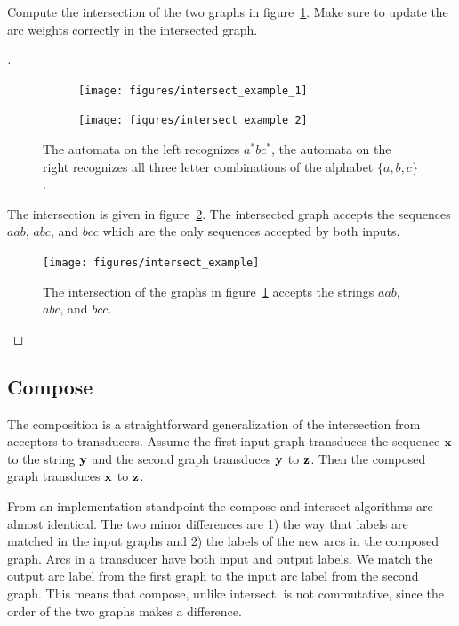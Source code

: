 \begin{example}
Compute the intersection of the two graphs in
figure~\ref{fig:intersect_example_inputs}. Make sure to update the arc
weights correctly in the intersected graph.
\end{example}

\begin{proof}[\unskip\nopunct]
\begin{figure}
    \centering
    \begin{subfigure}[b]{0.3\textwidth}
        \centering
        \texttt{[image: figures/intersect\_example\_1]}
    \end{subfigure}
    \begin{subfigure}[b]{0.68\textwidth}
        \centering
        \texttt{[image: figures/intersect\_example\_2]}
    \end{subfigure}
    \caption{The automata on the left recognizes $a^*bc^*$, the automata on the
    right recognizes all three letter combinations of the alphabet $\{a, b,
    c\}$.}
    \label{fig:intersect_example_inputs}
\end{figure}

The intersection is given in figure~\ref{fig:intersect_example}. The
intersected graph accepts the sequences $aab$, $abc$, and $bcc$ which are
the only sequences accepted by both inputs.

\begin{figure}
    \centering
    \texttt{[image: figures/intersect\_example]}
    \caption{The intersection of the graphs in
    figure~\ref{fig:intersect_example_inputs} accepts the strings $aab$, $abc$,
    and $bcc$.}
    \label{fig:intersect_example}
\end{figure}
\end{proof}

\subsection{Compose}

The composition is a straightforward generalization of the intersection from
acceptors to transducers. Assume the first input graph transduces the sequence
${\bf x}$ to the string ${\bf y}$ and the second graph transduces ${\bf y}$ to ${\bf z}$. Then
the composed graph transduces ${\bf x}$ to ${\bf z}$.

From an implementation standpoint the compose and intersect algorithms are
almost identical. The two minor differences are 1) the way that labels are
matched in the input graphs and 2) the labels of the new arcs in the composed
graph. Arcs in a transducer have both input and output labels. We match the
output arc label from the first graph to the input arc label from the second
graph. This means that compose, unlike intersect, is not commutative, since the
order of the two graphs makes a difference.

